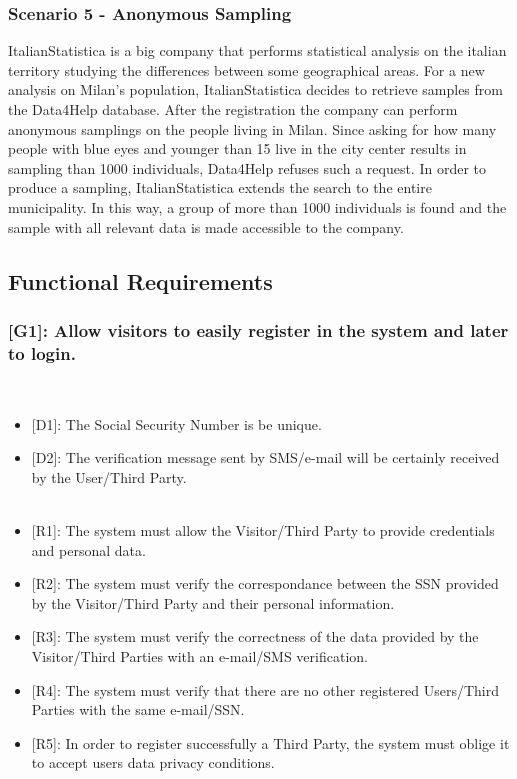 \documentclass[12pt,a4paper]{article}
\begin{document}
	\subsubsection*{Scenario 5 - Anonymous Sampling}
		ItalianStatistica is a big company that performs statistical analysis on the italian territory studying the differences between some geographical areas. For a new analysis on Milan's population, ItalianStatistica decides to retrieve samples from the Data4Help database. After the registration the company can perform anonymous samplings on the people living in Milan. Since asking for how many people with blue eyes and younger than 15 live in the city center results in sampling than 1000 individuals, Data4Help refuses such a request. In order to produce a sampling, ItalianStatistica extends the search to the entire municipality. In this way, a group of more than 1000 individuals is found and the sample with all relevant data is made accessible to the company.
	
	\newpage
	
	\subsection{Functional Requirements}
	
	\subsubsection*{{[}{G1}{]}: Allow visitors to easily register in the system and later to login.}
	\begin{itemize}\\
		\begin{itemize}
			\item {[D1]}: The Social Security Number is be unique.
			\item {[D2]}: The verification message sent by SMS/e-mail will be certainly received by the User/Third Party.
			\\\\
			\item {[R1]}: The system must allow the Visitor/Third Party to provide credentials and personal data.
			\item {[R2]}: The system must verify the correspondance between the SSN provided by the Visitor/Third Party and their personal information.
			\item {[R3]}: The system must verify the correctness of the data provided by the Visitor/Third Parties with an e-mail/SMS verification.
			\item {[R4]}: The system must verify that there are no other registered Users/Third Parties with the same e-mail/SSN.
			\item {[R5]}: In order to register successfully a Third Party, the system must oblige it to accept users data privacy conditions.
		\end{itemize} 
	\end{itemize}
\end{document}

